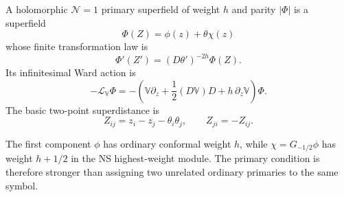 \begin{definition}
\label{def:n1-primary-superfield-superdistance}
A holomorphic \(\mathcal N=1\) primary superfield of weight \(h\) and parity
\(|\Phi|\) is a superfield
\[
  \Phi(Z)=\phi(z)+\theta\chi(z)
\]
whose finite transformation law is
\begin{equation}
  \Phi'(Z')=(D\theta')^{-2h}\Phi(Z).
  \label{eq:n1-primary-superfield-transformation}
\end{equation}
Its infinitesimal Ward action is
\begin{equation}
  -\mathcal L_{\mathbb V}\Phi
  =
  -\left(
    \mathbb V\partial_z
    +\frac12(D\mathbb V)D
    +h\,\partial_z\mathbb V
  \right)\Phi .
  \label{eq:n1-primary-superfield-infinitesimal}
\end{equation}
The basic two-point superdistance is
\begin{equation}
  Z_{ij}=z_i-z_j-\theta_i\theta_j,
  \qquad
  Z_{ji}=-Z_{ij}.
  \label{eq:n1-superdistance}
\end{equation}
\end{definition}

The first component \(\phi\) has ordinary conformal weight \(h\), while
\(\chi=G_{-1/2}\phi\) has weight \(h+1/2\) in the NS highest-weight module.
The primary condition is therefore stronger than assigning two unrelated
ordinary primaries to the same symbol.

